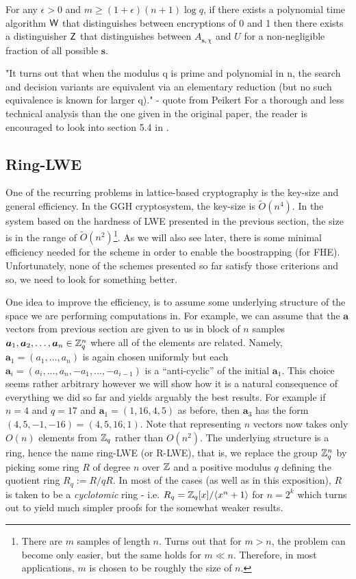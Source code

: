 \begin{lemma}\label{pseudo-lwe}
    For any $\epsilon > 0$ and $m \geq (1 + \epsilon)(n + 1) \log q$, if there exists a polynomial time algorithm $\alg{W}$ that distinguishes between encryptions of 0 and 1 then there exists a distinguisher $\alg{Z}$ that distinguishes between $A_{\bm{s}, \chi}$ and $U$ for a non-negligible fraction of all possible $\bm{s}$.
\end{lemma}
"It turns out that when the modulus q is prime and polynomial in n, the search and decision variants are equivalent via an elementary reduction (but no such equivalence is known for larger q)." - quote from Peikert
For a thorough and less technical analysis than the one given in the original paper, the reader is encouraged to look into section 5.4 in \cite{Micci2009}.
\subsection{Ring-LWE}
One of the recurring problems in lattice-based cryptography is the key-size and general efficiency. In the GGH cryptosystem, the key-size is $\tilde{O}(n^4)$. In the system based on the hardness of LWE presented in the previous section, the size is in the range of $\tilde{O}(n^2)$\footnote{There are $m$ samples of length $n$. Turns out that for $m > n$, the problem can become only easier, but the same holds for $m \ll n$. Therefore, in most applications, $m$ is chosen to be roughly the size of $n$.}. As we will also see later, there is some minimal efficiency needed for the scheme in order to enable the boostrapping (for FHE). Unfortunately, none of the schemes presented so far satisfy those criterions and so, we need to look for something better.

One idea to improve the efficiency, is to assume some underlying structure of the space we are performing computations in. For example, we can assume that the $\bm{a}$ vectors from previous section are given to us in block of $n$ samples $\boldsymbol{a}_1, \boldsymbol{a}_2, \dots, \boldsymbol{a}_n \in \mathbb{Z}_q^n$ where all of the elements are related. Namely, $\bm{a}_1 = (a_1, \dots, a_n)$ is again chosen uniformly but each $\bm{a}_i = (a_i, \dots, a_n, -a_1, \dots, -a_{i - 1})$ is a ``anti-cyclic'' of the initial $\bm{a}_1$. This choice seems rather arbitrary however we will show how it is a natural consequence of everything we did so far and yields arguably the best results. For example if $n = 4$ and $q = 17$ and $\bm{a}_1 = (1, 16, 4, 5)$ as before, then $\bm{a}_3$ has the form $(4, 5, -1, -16) = (4, 5, 16, 1)$. Note that representing $n$ vectors now takes only $O(n)$ elements from $\mathbb{Z}_q$ rather than $O(n^2)$. The underlying structure is a ring, hence the name ring-LWE (or R-LWE), that is, we replace the group $\mathbb{Z}_q^n$ by picking some ring $R$ of degree $n$ over $\mathbb{Z}$ and a positive modulus $q$ defining the quotient ring $R_q := R/qR$. In most of the cases (as well as in this exposition), $R$ is taken to be a \textit{cyclotomic} ring - i.e. $R_q = \mathbb{Z}_q[x]/\langle x^n + 1 \rangle$ for $n = 2^k$ which turns out to yield much simpler proofs for the somewhat weaker results.

